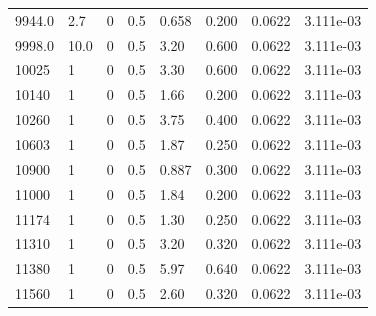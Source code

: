 \documentclass[preview]{standalone}
\begin{document}
{{{{{{\begin{tabular}{L{1.2cm}C{1.2cm} C{0.3cm}C{0.5cm} C{1.4cm}C{1.4cm} C{1.4cm}C{1.4cm}}
  9944.0  &   2.7  & 0     & 0.5 &  0.658  & 0.200  & 0.0622 &  3.111e-03   \\ 
  9998.0  &  10.0  & 0     & 0.5 &  3.20  & 0.600  & 0.0622 &  3.111e-03   \\ 
  10025  &     1  & 0     & 0.5 &  3.30  & 0.600  & 0.0622 &  3.111e-03   \\ 
  10140  &     1  & 0     & 0.5 &  1.66  & 0.200  & 0.0622 &  3.111e-03   \\ 
  10260  &     1  & 0     & 0.5 &  3.75  & 0.400  & 0.0622 &  3.111e-03   \\ 
  10603  &     1  & 0     & 0.5 &  1.87  & 0.250  & 0.0622 &  3.111e-03   \\ 
  10900  &     1  & 0     & 0.5 &  0.887  & 0.300  & 0.0622 &  3.111e-03   \\ 
  11000  &     1  & 0     & 0.5 &  1.84  & 0.200  & 0.0622 &  3.111e-03   \\ 
  11174  &     1  & 0     & 0.5 &  1.30  & 0.250  & 0.0622 &  3.111e-03   \\ 
  11310  &     1  & 0     & 0.5 &  3.20  & 0.320  & 0.0622 &  3.111e-03   \\ 
  11380  &     1  & 0     & 0.5 &  5.97  & 0.640  & 0.0622 &  3.111e-03   \\ 
  11560  &     1  & 0     & 0.5 &  2.60  & 0.320  & 0.0622 &  3.111e-03   \\ 
\hline 
\end{tabular} 

}}}}}}
\end{document}
